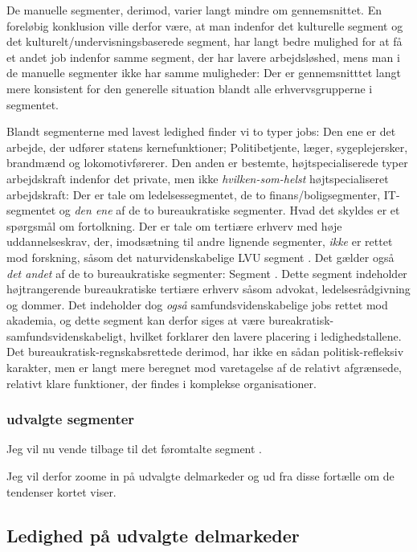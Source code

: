 De manuelle segmenter, derimod, varier langt mindre om gennemsnittet. En foreløbig konklusion ville derfor være, at man indenfor det kulturelle segment og det kulturelt/undervisningsbaserede segment, har langt bedre mulighed for at få et andet job indenfor samme segment, der har lavere arbejdsløshed, mens man i de manuelle segmenter ikke har samme muligheder: Der er gennemsnitttet langt mere konsistent for den generelle situation blandt alle erhvervsgrupperne i segmentet.  

Blandt segmenterne med lavest ledighed finder vi to typer jobs: Den ene er det arbejde, der udfører statens kernefunktioner; Politibetjente, læger, sygeplejersker, brandmænd og lokomotivførerer. Den anden er bestemte, højtspecialiserede typer arbejdskraft indenfor det private, men ikke \emph{hvilken-som-helst} højtspecialiseret arbejdskraft: Der er tale om ledelsessegmentet, de to finans/boligsegmenter, IT-segmentet og \emph{den ene} af de to bureaukratiske segmenter.  Hvad det skyldes er et spørgsmål om fortolkning. Der er tale om tertiære erhverv med høje uddannelseskrav, der, imodsætning til andre lignende segmenter, \emph{ikke} er rettet mod forskning, såsom det naturvidenskabelige LVU segment . Det gælder også \emph{det andet} af de to bureaukratiske segmenter: Segment . Dette segment indeholder højtrangerende bureaukratiske tertiære erhverv såsom advokat, ledelsesrådgivning og dommer. Det indeholder dog \emph{også} samfundsvidenskabelige jobs rettet mod akademia, og dette segment kan derfor siges at være bureakratisk-samfundsvidenskabeligt, hvilket forklarer den lavere placering i ledighedstallene. Det bureaukratisk-regnskabsrettede derimod, har ikke en sådan politisk-refleksiv karakter, men er langt mere beregnet mod varetagelse af de relativt afgrænsede, relativt klare funktioner, der findes i komplekse organisationer. 

%
\subsubsection{udvalgte segmenter}
%

Jeg vil nu vende tilbage til det føromtalte segment . 






 Jeg vil derfor zoome in på udvalgte delmarkeder og ud fra disse fortælle om de tendenser kortet viser. 


%
\subsection{Ledighed på udvalgte delmarkeder}
%

